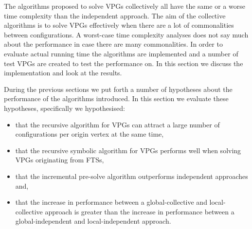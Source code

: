 The algorithms proposed to solve VPGs collectively all have the same or a worse time complexity than the independent approach. The aim of the collective algorithms is to solve VPGs effectively when there are a lot of commonalities between configurations. A worst-case time complexity analyses does not say much about the performance in case there are many commonalities. In order to evaluate actual running time the algorithms are implemented and a number of test VPGs are created to test the performance on. In this section we discuss the implementation and look at the results.

During the previous sections we put forth a number of hypotheses about the performance of the algorithms introduced. In this section we evaluate these hypotheses, specifically we hypothesised:
\begin{itemize}
	\item that the recursive algorithm for VPGs can attract a large number of configurations per origin vertex at the same time,
	\item that the recursive symbolic algorithm for VPGs performs well when solving VPGs originating from FTSs,
	\item that the incremental pre-solve algorithm outperforms independent approaches and,
	\item that the increase in performance between a global-collective and local-collective approach is greater than the increase in performance between a global-independent and local-independent approach.
\end{itemize}
